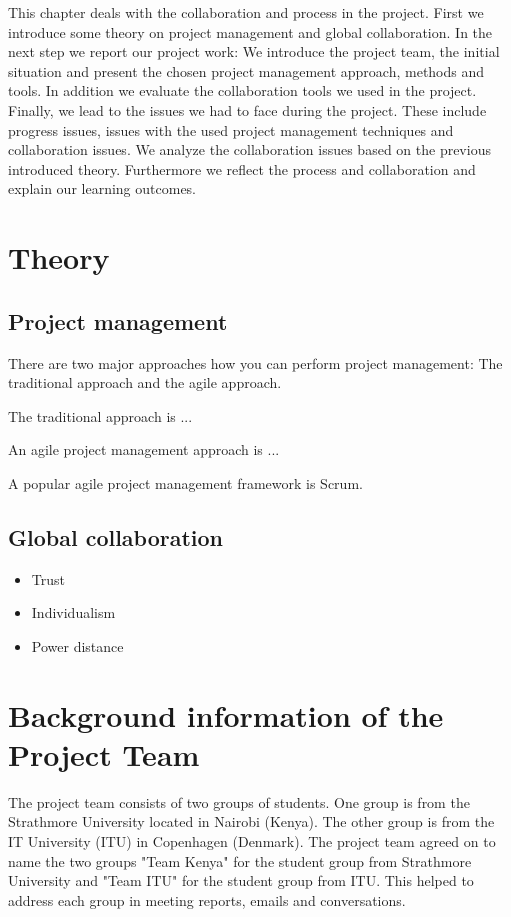 This chapter deals with the collaboration and process in the project. First we introduce some theory on project management and global collaboration. In the next step we report our project work: We introduce the project team, the initial situation and present the chosen project management approach, methods and tools. In addition we evaluate the collaboration tools we used in the project. Finally, we lead to the issues we had to face during the project. These include progress issues, issues with the used project management techniques and collaboration issues. We analyze the collaboration issues based on the previous introduced theory. Furthermore we reflect the process and collaboration and explain our learning outcomes.


\section{Theory}

\subsection{Project management}

There are two major approaches how you can perform project management: The traditional approach and the agile approach.

The traditional approach is ... 

An agile project management approach is ... 

A popular agile project management framework is Scrum. 

\subsection{Global collaboration} 

	\begin{itemize}
		\item Trust
		\item Individualism
		\item Power distance
	\end{itemize}


\section{Background information of the Project Team}
The project team consists of two groups of students. One group is from the Strathmore University located in Nairobi (Kenya). The other group is from the IT University (ITU) in Copenhagen (Denmark). The project team agreed on to name the two groups "Team Kenya" for the student group from Strathmore University and "Team ITU" for the student group from ITU. This helped to address each group in meeting reports, emails and conversations.

